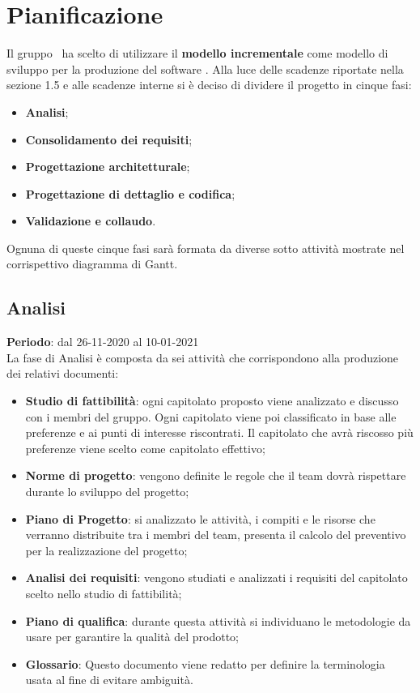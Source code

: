 \section{Pianificazione}
	Il gruppo \cod\ ha scelto di utilizzare il \textbf{modello incrementale} come modello di sviluppo per la produzione del software \hd .
	Alla luce delle scadenze riportate nella sezione 1.5 e alle scadenze interne si è deciso di dividere il progetto in cinque fasi:
	\begin{itemize}
		\item \textbf{Analisi};
		\item \textbf{Consolidamento dei requisiti};
		\item \textbf{Progettazione architetturale};
		\item \textbf{Progettazione di dettaglio e codifica};
		\item \textbf{Validazione e collaudo}.
	\end{itemize}
	Ognuna di queste cinque fasi sarà formata da diverse sotto attività mostrate nel corrispettivo diagramma di Gantt.

	\subsection{Analisi}	\textbf{Periodo}: dal 26-11-2020 al 10-01-2021 \\
	La fase di Analisi è composta da sei attività che corrispondono alla produzione dei relativi documenti:
	\begin{itemize}
		\item \textbf{Studio di fattibilità}: ogni capitolato proposto viene analizzato e discusso con i membri del gruppo. Ogni capitolato viene poi classificato in base alle preferenze e ai punti di interesse riscontrati. Il capitolato che avrà riscosso più preferenze viene scelto come capitolato effettivo;
		\item \textbf{Norme di progetto}: vengono definite le regole che il team dovrà rispettare durante lo sviluppo del progetto;
		\item \textbf{Piano di Progetto}: si analizzato le attività, i compiti e le risorse che verranno distribuite tra i membri del team, presenta il calcolo del preventivo per la realizzazione del progetto;
		\item \textbf{Analisi dei requisiti}: vengono studiati e analizzati i requisiti del capitolato scelto nello studio di fattibilità;
		\item \textbf{Piano di qualifica}: durante questa attività si individuano le metodologie da usare per garantire la qualità del prodotto;
		\item \textbf{Glossario}: Questo documento viene redatto per definire la terminologia usata al fine di evitare ambiguità.
	\end{itemize}
